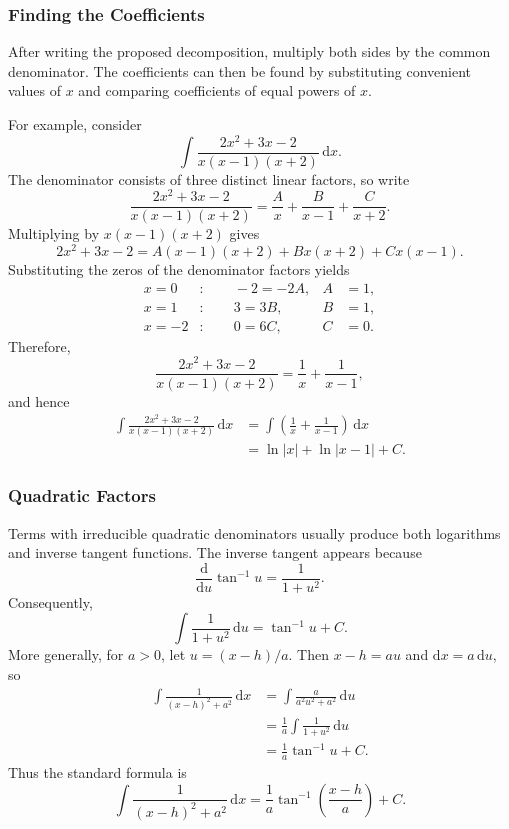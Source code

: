 \subsubsection{Finding the Coefficients}

After writing the proposed decomposition, multiply both sides by the common
denominator.  The coefficients can then be found by substituting convenient
values of \(x\) and comparing coefficients of equal powers of \(x\).

For example, consider
\[
    \int\frac{2x^2+3x-2}{x(x-1)(x+2)}\,\mathrm{d}x.
\]
The denominator consists of three distinct linear factors, so write
\[
    \frac{2x^2+3x-2}{x(x-1)(x+2)}
    =\frac{A}{x}+\frac{B}{x-1}+\frac{C}{x+2}.
\]
Multiplying by \(x(x-1)(x+2)\) gives
\[
    2x^2+3x-2
    =A(x-1)(x+2)+Bx(x+2)+Cx(x-1).
\]
Substituting the zeros of the denominator factors yields
\begin{align*}
    x=0&:\qquad -2=-2A, & A&=1,\\
    x=1&:\qquad 3=3B,   & B&=1,\\
    x=-2&:\qquad 0=6C,  & C&=0.
\end{align*}
Therefore,
\[
    \frac{2x^2+3x-2}{x(x-1)(x+2)}
    =\frac{1}{x}+\frac{1}{x-1},
\]
and hence
\begin{align*}
    \int\frac{2x^2+3x-2}{x(x-1)(x+2)}\,\mathrm{d}x
    &=\int\left(\frac1x+\frac1{x-1}\right)\,\mathrm{d}x \\
    &=\ln|x|+\ln|x-1|+C.
\end{align*}

\subsubsection{Quadratic Factors}

Terms with irreducible quadratic denominators usually produce both logarithms
and inverse tangent functions.  The inverse tangent appears because
\[
    \frac{\mathrm{d}}{\mathrm{d}u}\tan^{-1}u
    =\frac{1}{1+u^2}.
\]
Consequently,
\[
    \int\frac{1}{1+u^2}\,\mathrm{d}u=\tan^{-1}u+C.
\]
More generally, for \(a>0\), let \(u=(x-h)/a\).  Then
\(x-h=au\) and \(\mathrm{d}x=a\,\mathrm{d}u\), so
\begin{align*}
    \int\frac{1}{(x-h)^2+a^2}\,\mathrm{d}x
    &=\int\frac{a}{a^2u^2+a^2}\,\mathrm{d}u \\
    &=\frac1a\int\frac{1}{1+u^2}\,\mathrm{d}u \\
    &=\frac1a\tan^{-1}u+C.
\end{align*}
Thus the standard formula is
\[
    \boxed{
        \int\frac{1}{(x-h)^2+a^2}\,\mathrm{d}x
        =\frac1a\tan^{-1}\!\left(\frac{x-h}{a}\right)+C
    }.
\]

